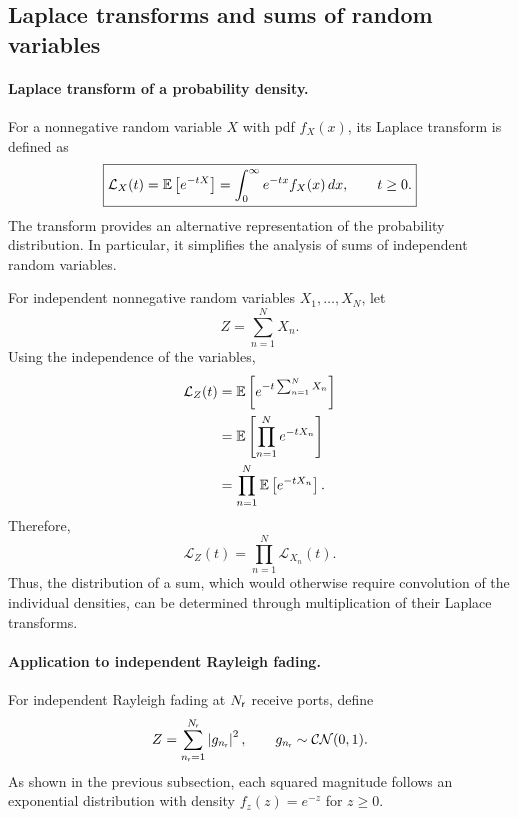 \subsection{Laplace transforms and sums of random variables}

\paragraph{Laplace transform of a probability density.}
For a nonnegative random variable $X$ with \ac{pdf} $f_X(x)$, its Laplace transform is defined as
\begin{equation}\label{eq:app-laplace}
	\boxed{
		\mathcal{L}_X(t)
		=\mathbb{E}\left[e^{-tX}\right]
		=\int_0^\infty e^{-tx}f_X(x)\,dx,
		\qquad t\geq0.
	}
\end{equation}
The transform provides an alternative representation of the probability distribution. In particular, it simplifies the analysis of sums of independent random variables.

For independent nonnegative random variables $X_1,\ldots,X_N$, let
\begin{equation*}
	Z=\sum_{n=1}^{N}X_n.
\end{equation*}
Using the independence of the variables,
\begin{align*}
	\mathcal{L}_Z(t)
	&=\mathbb{E}\left[e^{-t\sum_{n=1}^{N}X_n}\right]\\
	&=\mathbb{E}\left[\prod_{n=1}^{N}e^{-tX_n}\right]\\
	&=\prod_{n=1}^{N}\mathbb{E}\left[e^{-tX_n}\right].
\end{align*}
Therefore,
\begin{equation}\label{eq:app-laplace-sum}
	\boxed{
		\mathcal{L}_Z(t)
		=\prod_{n=1}^{N}\mathcal{L}_{X_n}(t).
	}
\end{equation}
Thus, the distribution of a sum, which would otherwise require convolution of the individual densities, can be determined through multiplication of their Laplace transforms.

\paragraph{Application to independent Rayleigh fading.}
For independent Rayleigh fading at $N_{\mathsf{r}}$ receive ports, define
\begin{equation*}
	Z=\sum_{n_{\mathsf r}=1}^{N_{\mathsf{r}}}
	\left|g_{n_{\mathsf r}}\right|^2,
	\qquad
	g_{n_{\mathsf r}}\sim\mathcal{CN}(0,1).
\end{equation*}
As shown in the previous subsection, each squared magnitude follows an exponential distribution with density $f_z(z)=e^{-z}$ for $z\geq0$.

